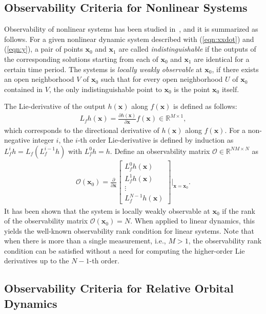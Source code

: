 \documentclass[letterpaper, paper,10pt]{AAS}		%
\newcommand{\refeqn}[1]{(\ref{eqn:#1})}
\newcommand{\deriv}[2]{\ensuremath{\frac{\partial #1}{\partial #2}}}
\renewcommand{\L}{\ensuremath{\mathsf{L}}}
\renewcommand{\Re}{\ensuremath{\mathbb{R}}}
\newcommand{\x}{\ensuremath{\mathbf{x}}}
\begin{document}
\subsection{Observability Criteria for Nonlinear Systems}

Observability of nonlinear systems has been studied in~\cite{HerKreITAC77}, and it is summarized as follows. For a given nonlinear dynamic system described with \refeqn{xxdot} and \refeqn{y}, a pair of points $\x_0$ and $\x_1$ are called \textit{indistinguishable} if the outputs of the corresponding solutions starting from each of $\x_0$ and $\x_1$ are identical for a certain time period. The systems is \textit{locally weakly observable} at $\x_0$, if there exists an open neighborhood $V$ of $\x_0$ such that for every open neighborhood $U$ of $\x_0$ contained in $V$, the only indistinguishable point to $\x_0$ is the point $\x_0$ itself. 

The Lie-derivative of the output $h(\x)$ along $f(\x)$ is defined as follows:
\begin{align*}
L_f h(\x) = \deriv{h(\x)}{\x}f(\x)\in\Re^{M\times 1},
\end{align*}
which corresponds to the directional derivative of $h(\x)$ along $f(\x)$. For a non-negative integer $i$, the $i$-th order Lie-derivative is defined by induction as $L_f^i h = L_f (L_f^{i-1} h)$ with $L_f^0 h = h$. Define an observability matrix $\mathcal{O}\in\Re^{NM\times N}$ as
\begin{align*}
\mathcal{O}(\x_0) = \deriv{}{\x} \begin{bmatrix} L_f^0 h(\x) \\ L_f^1 h(\x)\\ \vdots \\L_f^{N-1} h(\x)\end{bmatrix}\bigg|_{\x=\x_0}.
\end{align*}
It has been shown that the system is locally weakly observable at $\x_0$ if the rank of the observability matrix $\mathcal{O}(\x_0) = N$. When applied to linear dynamics, this yields the well-known observability rank condition for linear systems. Note that when there is more than a single measurement, i.e., $M>1$, the observability rank condition can be satisfied without a need for computing the higher-order Lie derivatives up to the $N-1$-th order.

\subsection{Observability Criteria for Relative Orbital Dynamics}
\end{document}
